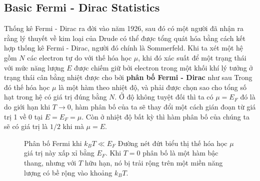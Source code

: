 \subsection{Basic Fermi - Dirac Statistics}
Thống kê Fermi - Dirac ra đời vào năm 1926, sau đó có một người đã nhận ra rằng lý thuyết về kim loại của Drude có thể được tổng quát hóa bằng cách kết hợp thống kê Fermi - Dirac, người đó chính là Sommerfeld.
Khi ta xét một hệ gồm $N$ các electron tự do với thế hóa học $\mu$, khi đó xác suất để một trạng thái với mức năng lượng $E$ được chiếm giữ bởi electron trong một khối khí lý tưởng ở trạng thái cân bằng nhiệt được cho bởi
\textbf{phân bố Fermi - Dirac} như sau
Trong đó thế hóa học $\mu$ là một hàm theo nhiệt độ, và phải được chọn sao cho tổng số hạt trong hệ có giá trị đúng bằng $N$. Ở độ không tuyệt đối thì ta có $\mu = E_F$ đó là do giới hạn khi $T \rightarrow 0$, hàm phân bố của ta sẽ thay đổi một cách
gián đoạn từ giá trị 1 về 0 tại $E = E_F = \mu$. Còn ở nhiệt độ bất kỳ thì hàm phân bố của chúng ta sẽ có giá trị là $1/2$ khi mà $\mu = E$.\\
\begin{figure}[H]
    \centering
    \caption{Phân bố Fermi khi $k_BT \ll E_F$ Đường nét đứt biểu thị thế hóa học $\mu$ giá trị này xấp xỉ bằng $E_F$. Khi $T=0$ phân bố là một hàm bậc thang, nhưng với $T$ hữu hạn, nó bị trải rộng trên một miền năng lượng có bề rộng vào khoảng $k_BT$.}
    \label{fig:1.4}
\end{figure}
